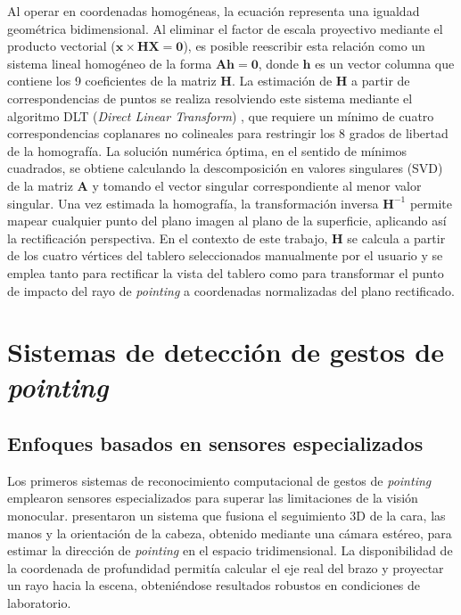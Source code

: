 \documentclass[12pt]{report} %
\begin{document}
Al operar en coordenadas homogéneas, la ecuación representa una igualdad geométrica bidimensional. Al eliminar el factor de escala proyectivo mediante el producto vectorial ($\mathbf{x} \times \mathbf{H}\mathbf{X} = \mathbf{0}$), es posible reescribir esta relación como un sistema lineal homogéneo de la forma $\mathbf{A}\mathbf{h} = \mathbf{0}$, donde $\mathbf{h}$ es un vector columna que contiene los 9 coeficientes de la matriz $\mathbf{H}$. La estimación de $\mathbf{H}$ a partir de correspondencias de puntos se realiza resolviendo este sistema mediante el algoritmo DLT (\textit{Direct Linear Transform}) \citep{hartley2003}, que requiere un mínimo de cuatro correspondencias coplanares no colineales para restringir los 8 grados de libertad de la homografía. La solución numérica óptima, en el sentido de mínimos cuadrados, se obtiene calculando la descomposición en valores singulares (SVD) de la matriz $\mathbf{A}$ y tomando el vector singular correspondiente al menor valor singular. Una vez estimada la homografía, la transformación inversa $\mathbf{H}^{-1}$ permite mapear cualquier punto del plano imagen al plano de la superficie, aplicando así la rectificación perspectiva. En el contexto de este trabajo, $\mathbf{H}$ se calcula a partir de los cuatro vértices del tablero seleccionados manualmente por el usuario y se emplea tanto para rectificar la vista del tablero como para transformar el punto de impacto del rayo de \textit{pointing} a coordenadas normalizadas del plano rectificado.

\section{Sistemas de detección de gestos de \textit{pointing}}

\subsection{Enfoques basados en sensores especializados}

Los primeros sistemas de reconocimiento computacional de gestos de \textit{pointing} emplearon sensores especializados para superar las limitaciones de la visión monocular. \citet{nickel2003pointing} presentaron un sistema que fusiona el seguimiento 3D de la cara, las manos y la orientación de la cabeza, obtenido mediante una cámara estéreo, para estimar la dirección de \textit{pointing} en el espacio tridimensional. La disponibilidad de la coordenada de profundidad permitía calcular el eje real del brazo y proyectar un rayo hacia la escena, obteniéndose resultados robustos en condiciones de laboratorio.
\end{document}
